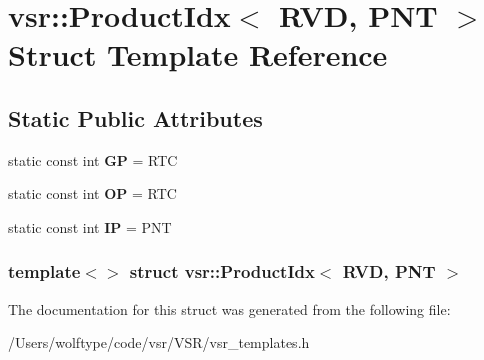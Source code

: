 \hypertarget{structvsr_1_1_product_idx_3_01_r_v_d_00_01_p_n_t_01_4}{\section{vsr\-:\-:Product\-Idx$<$ R\-V\-D, P\-N\-T $>$ Struct Template Reference}
\label{structvsr_1_1_product_idx_3_01_r_v_d_00_01_p_n_t_01_4}
}
\subsection*{Static Public Attributes}
\begin{DoxyCompactItemize}
\item 
\hypertarget{structvsr_1_1_product_idx_3_01_r_v_d_00_01_p_n_t_01_4_ada3716eb0bc73492ccba39aca43a5ba0}{static const int {\bfseries G\-P} = R\-T\-C}\label{structvsr_1_1_product_idx_3_01_r_v_d_00_01_p_n_t_01_4_ada3716eb0bc73492ccba39aca43a5ba0}

\item 
\hypertarget{structvsr_1_1_product_idx_3_01_r_v_d_00_01_p_n_t_01_4_a6aba371e1088be5bd01ad5cb1ba63c6b}{static const int {\bfseries O\-P} = R\-T\-C}\label{structvsr_1_1_product_idx_3_01_r_v_d_00_01_p_n_t_01_4_a6aba371e1088be5bd01ad5cb1ba63c6b}

\item 
\hypertarget{structvsr_1_1_product_idx_3_01_r_v_d_00_01_p_n_t_01_4_a9282b5fb9ca1e740757d1052255d19aa}{static const int {\bfseries I\-P} = P\-N\-T}\label{structvsr_1_1_product_idx_3_01_r_v_d_00_01_p_n_t_01_4_a9282b5fb9ca1e740757d1052255d19aa}

\end{DoxyCompactItemize}
\subsubsection*{template$<$$>$ struct vsr\-::\-Product\-Idx$<$ R\-V\-D, P\-N\-T $>$}



The documentation for this struct was generated from the following file\-:\begin{DoxyCompactItemize}
\item 
/\-Users/wolftype/code/vsr/\-V\-S\-R/vsr\-\_\-templates.\-h\end{DoxyCompactItemize}
